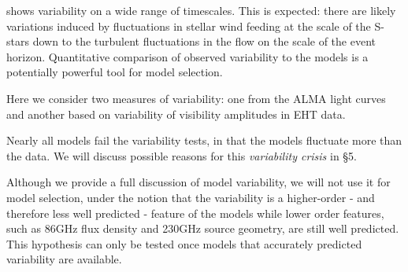 %


\sgra shows variability on a wide range of timescales.  This is expected: there are likely variations induced by fluctuations in stellar wind feeding at the scale of the S-stars down to the turbulent fluctuations in the flow on the scale of the event horizon.  Quantitative comparison of observed variability to the models is a potentially powerful tool for model selection.

Here we consider two measures of variability: one from the ALMA light curves and another based on variability of visibility amplitudes in EHT data.  

Nearly all models fail the variability tests, in that the models fluctuate more than the data.  We will discuss possible reasons for this {\em variability crisis} in \S 5. 

Although we provide a full discussion of model variability, we will not use it for model selection, under the notion that the variability is a higher-order - and therefore less well predicted -  feature of the models while lower order features, such as 86GHz flux density and 230GHz source geometry, are still well predicted.  This hypothesis can only be tested once models that accurately predicted variability are available.   

